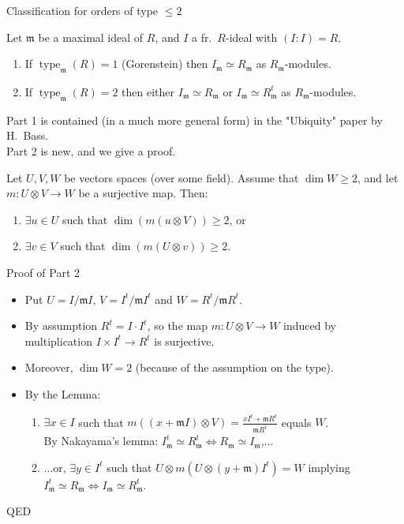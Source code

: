\documentclass[usenames,dvipsnames]{beamer}
\DeclareMathOperator{\type}{type}
\renewcommand{\frm}{{\mathfrak m}}
\begin{document}
\begin{frame}{ Classification for orders of type $\leq 2$ } 
    \begin{theorem}
        Let $\frm$ be a maximal ideal of $R$, and $I$ a fr.~$R$-ideal with $(I:I)=R$.
        \begin{enumerate}
            \item \pause If $\type_\frm(R)=1$ (Gorenstein) then $I_\frm\simeq R_\frm$ as $R_\frm$-modules.
            \item \pause If $\type_\frm(R)=2$ then either $I_\frm\simeq R_\frm$ or $I_\frm\simeq R^t_\frm$  as $R_\frm$-modules.
        \end{enumerate}
    \end{theorem}

    \pause Part 1 is contained (in a much more general form) in the "Ubiquity" paper by H.~Bass.\\
    Part 2 is new, and we give a proof.
    \pause 
\begin{lemma}
    Let $U,V,W$ be vectors spaces (over some field). Assume that $\dim W \ge 2$, and let $m: U\otimes V\to W$ be a surjective map. Then:
    \begin{enumerate}
        \item \pause $\exists u\in U$ such that $\dim(m(u\otimes V)) \ge 2$, or
        \item \pause $\exists v\in V$ such that $\dim(m(U\otimes v)) \ge 2$.
    \end{enumerate}
\end{lemma}

\end{frame}


\begin{frame}{ Proof of Part 2 } 
    \begin{itemize}
    \item \pause Put $U = I/\frm I$, $V = I^t/\frm I^t$ and $W = R^t/\frm R^t$.
    \item \pause By assumption $R^t = I \cdot I^t$, so the map $ m: U \otimes V \to W $ induced by multiplication $I \times I^t \to R^t$
    is surjective.
    \item \pause Moreover, $\dim W = 2$ (because of the assumption on the type).
    \item \pause By the Lemma:
    \begin{enumerate}
        \item $\exists x \in I$ such that $m( (x+\frm I) \otimes V  ) = \frac{x I^t + \frm R^t }{ \frm R^t }$ equals $W$.\\
            By Nakayama's lemma: $I_\frm^t\simeq R_\frm^t \iff R_\frm\simeq I_\frm $,...
        \item \pause ...or, $\exists y \in I^t$ such that $U \otimes m( U \otimes (y+\frm) I^t ) = W $ implying $I^t_\frm \simeq R_\frm \iff I_\frm \simeq R^t_\frm$.
    \end{enumerate}
	\end{itemize}
    \pause \hspace{0.5cm}QED
\end{frame}
\end{document}
